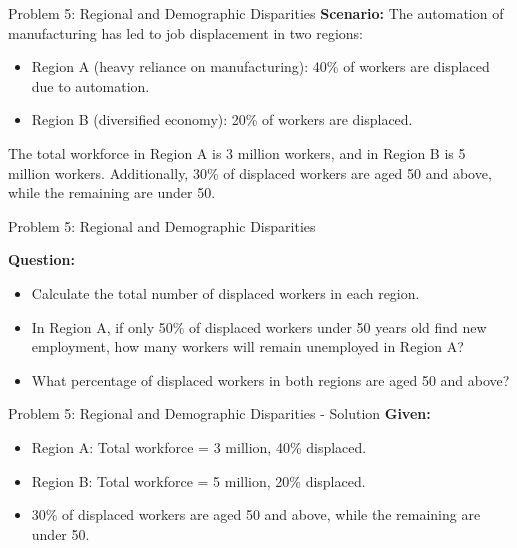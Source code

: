 \documentclass{beamer}
\begin{document}
\begin{frame}{Problem 5: Regional and Demographic Disparities}
\textbf{Scenario:}
The automation of manufacturing has led to job displacement in two regions:
\begin{itemize}
    \item Region A (heavy reliance on manufacturing): 40\% of workers are displaced due to automation.
    \item Region B (diversified economy): 20\% of workers are displaced.
\end{itemize}

The total workforce in Region A is 3 million workers, and in Region B is 5 million workers. Additionally, 30\% of displaced workers are aged 50 and above, while the remaining are under 50.


\end{frame}




\begin{frame}{Problem 5: Regional and Demographic Disparities}


\textbf{Question:}
\begin{itemize}
    \item Calculate the total number of displaced workers in each region.
    \item In Region A, if only 50\% of displaced workers under 50 years old find new employment, how many workers will remain unemployed in Region A?
    \item What percentage of displaced workers in both regions are aged 50 and above?
\end{itemize}
\end{frame}

\begin{frame}{Problem 5: Regional and Demographic Disparities - Solution}
\textbf{Given:}
\begin{itemize}
    \item Region A: Total workforce = 3 million, 40\% displaced.
    \item Region B: Total workforce = 5 million, 20\% displaced.
    \item 30\% of displaced workers are aged 50 and above, while the remaining are under 50.
\end{itemize}


\end{frame}
\end{document}

